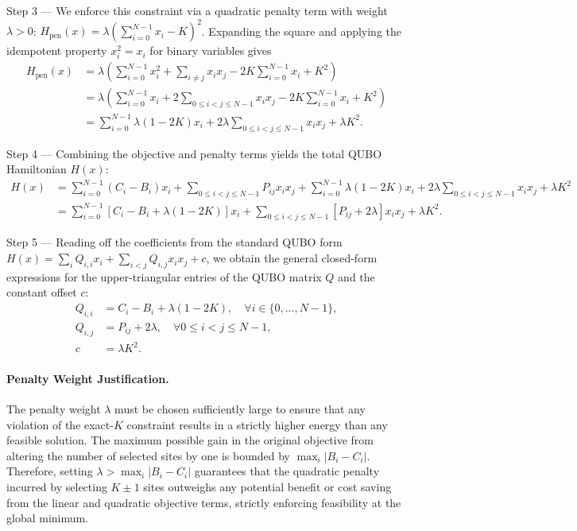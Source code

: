 \documentclass[12pt]{article}
\begin{document}
Step 3 --- We enforce this constraint via a quadratic penalty term with weight $\lambda > 0$: $H_{\text{pen}}(x) = \lambda \left( \sum_{i=0}^{N-1} x_i - K \right)^2$. Expanding the square and applying the idempotent property $x_i^2 = x_i$ for binary variables gives
\begin{align}
  H_{\text{pen}}(x) &= \lambda \left( \sum_{i=0}^{N-1} x_i^2 + \sum_{i \neq j} x_i x_j - 2K \sum_{i=0}^{N-1} x_i + K^2 \right) \\
  &= \lambda \left( \sum_{i=0}^{N-1} x_i + 2 \sum_{0 \le i < j \le N-1} x_i x_j - 2K \sum_{i=0}^{N-1} x_i + K^2 \right) \\
  &= \sum_{i=0}^{N-1} \lambda(1 - 2K) x_i + 2\lambda \sum_{0 \le i < j \le N-1} x_i x_j + \lambda K^2.
\end{align}

Step 4 --- Combining the objective and penalty terms yields the total QUBO Hamiltonian $H(x)$:
\begin{align}
  H(x) &= \sum_{i=0}^{N-1} (C_i - B_i) x_i + \sum_{0 \le i < j \le N-1} P_{ij} x_i x_j + \sum_{i=0}^{N-1} \lambda(1 - 2K) x_i + 2\lambda \sum_{0 \le i < j \le N-1} x_i x_j + \lambda K^2 \\
  &= \sum_{i=0}^{N-1} \left[ C_i - B_i + \lambda(1 - 2K) \right] x_i + \sum_{0 \le i < j \le N-1} \left[ P_{ij} + 2\lambda \right] x_i x_j + \lambda K^2.
\end{align}

Step 5 --- Reading off the coefficients from the standard QUBO form $H(x) = \sum_{i} Q_{i,i} x_i + \sum_{i < j} Q_{i,j} x_i x_j + c$, we obtain the general closed-form expressions for the upper-triangular entries of the QUBO matrix $Q$ and the constant offset $c$:
\begin{align}
  Q_{i,i} &= C_i - B_i + \lambda(1 - 2K), \quad \forall i \in \{0,\dots,N-1\}, \\
  Q_{i,j} &= P_{ij} + 2\lambda, \quad \forall 0 \le i < j \le N-1, \\
  c &= \lambda K^2.
\end{align}

\paragraph{Penalty Weight Justification.}
The penalty weight $\lambda$ must be chosen sufficiently large to ensure that any violation of the exact-$K$ constraint results in a strictly higher energy than any feasible solution. The maximum possible gain in the original objective from altering the number of selected sites by one is bounded by $\max_{i} |B_i - C_i|$. Therefore, setting $\lambda > \max_{i} |B_i - C_i|$ guarantees that the quadratic penalty incurred by selecting $K \pm 1$ sites outweighs any potential benefit or cost saving from the linear and quadratic objective terms, strictly enforcing feasibility at the global minimum.
\end{document}
